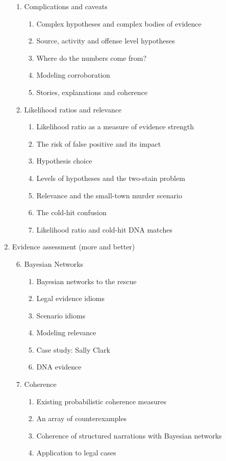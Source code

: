 \documentclass[
  10pt,
  dvipsnames,enabledeprecatedfontcommands]{scrartcl}
\begin{document}
\begin{multicols}{2}
\begin{enumerate}
\begin{enumerate}
  
  
  \item  Complications and caveats
  \begin{enumerate}
  \item  Complex hypotheses and complex bodies of evidence
  \item Source, activity and offense level hypotheses
  \item  Where do the numbers come from?
  \item  Modeling corroboration
  \item  Stories, explanations and coherence
  \end{enumerate}

  
  \item  Likelihood ratios and relevance
  \begin{enumerate}
  \item Likelihood ratio as a measure of evidence strength
  \item The risk of false positive and its impact
  \item Hypothesis choice
  \item Levels of hypotheses and the two-stain problem
  \item Relevance and the small-town murder scenario
  \item The cold-hit confusion
  \item  Likelihood ratio and  cold-hit DNA matches
  \end{enumerate}


\end{enumerate}
\item  Evidence assessment (more and better)
\begin{enumerate}

\setcounter{enumii}{5}
\item  Bayesian Networks

  \begin{enumerate}
  \item  Bayesian networks to the rescue
  \item  Legal evidence idioms
  \item Scenario idioms
  \item Modeling relevance
  \item  Case study: Sally Clark
  \item DNA evidence
  \end{enumerate}
  
   \item Coherence
  \begin{enumerate}
  \item  Existing probabilistic coherence measures
  \item  An array of counterexamples
  \item Coherence of structured narrations with Bayesian networks
  \item  Application to legal cases
  \end{enumerate}
  

\end{enumerate}
\end{enumerate}
\end{multicols}
\end{document}

